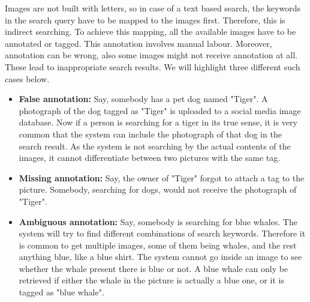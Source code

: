 \documentclass[english]{tktltiki}
\begin{document}
Images are not built with letters, so in case of a text based search, the keywords in the search query have to be mapped to the images first. Therefore, this is indirect searching. To achieve this mapping, all the available images have to be annotated or tagged. This annotation involves manual labour. Moreover, annotation can be wrong, also some images might not receive annotation at all. These lead to inappropriate search results. We will highlight three different such cases below.

\begin{itemize}
	\item \textbf{False annotation: }Say, somebody has a pet dog named "Tiger". A photograph of the dog tagged as "Tiger" is uploaded to a social media image database. Now if a person is searching for a tiger in its true sense, it is very common that the system can include the photograph of that dog in the search result. As the system is not searching by the actual contents of the images, it cannot differentiate between two pictures with the same tag.
	\item \textbf{Missing annotation: }Say, the owner of "Tiger" forgot to attach a tag to the picture. Somebody, searching for dogs, would not receive the photograph of "Tiger".
	\item \textbf{Ambiguous annotation: }Say, somebody is searching for blue whales. The system will try to find different combinations of search keywords. Therefore it is common to get multiple images, some of them being whales, and the rest anything blue, like a blue shirt. The system cannot go inside an image to see whether the whale present there is blue or not. A blue whale can only be retrieved if either the whale in the picture is actually a blue one, or it is tagged as "blue whale".
\end{itemize}
\end{document}
